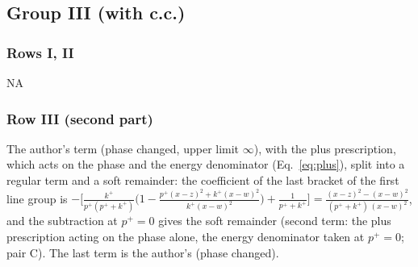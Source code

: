 \subsection{Group III (with c.c.)}
\subsubsection*{Rows I, II} \textsc{NA}
\subsubsection*{Row III (second part)}
The author's term (phase changed, upper limit $\infty$), with the plus prescription, which acts on the phase and the energy denominator (Eq.~\eqref{eq:plus}), split into a regular term and a soft remainder: the coefficient of the last bracket of the first line group is $-\big[\frac{k^{+}}{p^{+}(p^{+}+k^{+})}\big(1-\frac{p^{+}(x-z)^{2}+k^{+}(x-w)^{2}}{k^{+}(x-w)^{2}}\big)+\frac{1}{p^{+}+k^{+}}\big]=\frac{(x-z)^{2}-(x-w)^{2}}{(p^{+}+k^{+})\,(x-w)^{2}}$, and the subtraction at $p^{+}=0$ gives the soft remainder (second term: the plus prescription acting on the phase alone, the energy denominator taken at $p^{+}=0$; pair C). The last term is the author's (phase changed).
